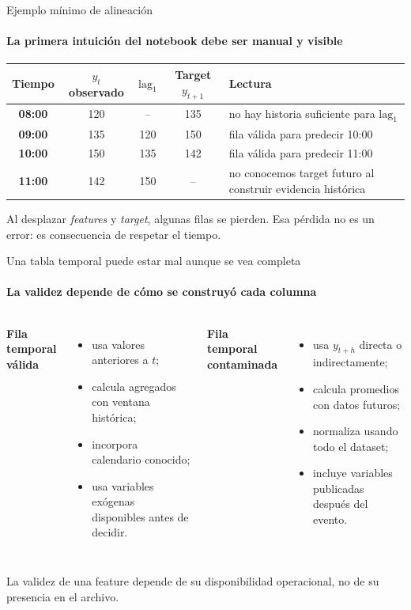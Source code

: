 \documentclass[aspectratio=169,11pt]{beamer}  %
\newcommand{\hrow}{\rowcolor{mlcream}}
\begin{document}
\begin{frame}{Ejemplo mínimo de alineación}
\framesubtitle{La primera intuición del notebook debe ser manual y visible}
\centering
\begin{tabular}{@{}c c c c P{0.36\textwidth}@{}}
\toprule
\hrow \textbf{Tiempo} & $y_t$ observado & $\mathrm{lag}_1$ & Target $y_{t+1}$ & Lectura\\
\midrule
\textbf{08:00} & 120 & -- & 135 & no hay historia suficiente para $\mathrm{lag}_1$\\
\textbf{09:00} & 135 & 120 & 150 & fila válida para predecir 10:00\\
\textbf{10:00} & 150 & 135 & 142 & fila válida para predecir 11:00\\
\textbf{11:00} & 142 & 150 & -- & no conocemos target futuro al construir evidencia histórica\\
\bottomrule
\end{tabular}

\vspace{1.5em}
Al desplazar \emph{features} y \emph{target}, algunas filas se pierden. Esa pérdida no es un error: es consecuencia de respetar el tiempo.
\end{frame}

\begin{frame}{Una tabla temporal puede estar mal aunque se vea completa}
\framesubtitle{La validez depende de cómo se construyó cada columna}
\begin{columns}[T]
\textbf{Fila temporal válida}
\begin{itemize}
\item usa valores anteriores a $t$;
\item calcula agregados con ventana histórica;
\item incorpora calendario conocido;
\item usa variables exógenas disponibles antes de decidir.
\end{itemize}
\textbf{Fila temporal contaminada}
\begin{itemize}
\item usa $y_{t+h}$ directa o indirectamente;
\item calcula promedios con datos futuros;
\item normaliza usando todo el dataset;
\item incluye variables publicadas después del evento.
\end{itemize}
\end{columns}
\begin{rulebox}
La validez de una feature depende de su disponibilidad operacional, no de su presencia en el archivo.
\end{rulebox}
\end{frame}
\end{document}
